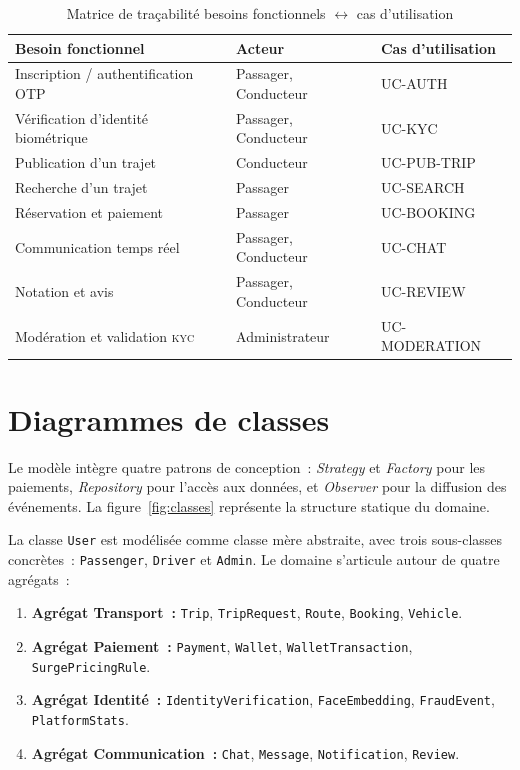 \begin{table}[H]
\centering
\footnotesize
\begin{tabularx}{\textwidth}{|X|l|l|}
\hline
\rowcolor{rohlight}
\textbf{Besoin fonctionnel} & \textbf{Acteur} & \textbf{Cas d'utilisation} \\
\hline
Inscription / authentification OTP & Passager, Conducteur & UC-AUTH \\
\hline
Vérification d'identité biométrique & Passager, Conducteur & UC-KYC \\
\hline
Publication d'un trajet & Conducteur & UC-PUB-TRIP \\
\hline
Recherche d'un trajet & Passager & UC-SEARCH \\
\hline
Réservation et paiement & Passager & UC-BOOKING \\
\hline
Communication temps réel & Passager, Conducteur & UC-CHAT \\
\hline
Notation et avis & Passager, Conducteur & UC-REVIEW \\
\hline
Modération et validation \textsc{kyc} & Administrateur & UC-MODERATION \\
\hline
\end{tabularx}
  \caption{Matrice de traçabilité besoins fonctionnels $\leftrightarrow$ cas d'utilisation}
  \label{tab:tracabilite}
\end{table}

\section{Diagrammes de classes}
\label{sec:classes}

Le modèle intègre quatre patrons de conception~: \textit{Strategy} et \textit{Factory} pour les paiements, \textit{Repository} pour l'accès aux données, et \textit{Observer} pour la diffusion des événements. La figure~\ref{fig:classes} représente la structure statique du domaine.

La classe \texttt{User} est modélisée comme classe mère abstraite, avec trois sous-classes concrètes~: \texttt{Passenger}, \texttt{Driver} et \texttt{Admin}. Le domaine s'articule autour de quatre agrégats~:
\begin{enumerate}
  \item \textbf{Agrégat Transport~:} \texttt{Trip}, \texttt{TripRequest}, \texttt{Route}, \texttt{Booking}, \texttt{Vehicle}.
  \item \textbf{Agrégat Paiement~:} \texttt{Payment}, \texttt{Wallet}, \texttt{WalletTransaction}, \texttt{SurgePricingRule}.
  \item \textbf{Agrégat Identité~:} \texttt{IdentityVerification}, \texttt{FaceEmbedding}, \texttt{FraudEvent}, \texttt{PlatformStats}.
  \item \textbf{Agrégat Communication~:} \texttt{Chat}, \texttt{Message}, \texttt{Notification}, \texttt{Review}.
\end{enumerate}

